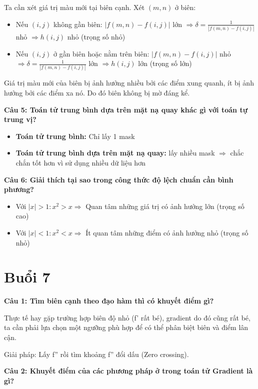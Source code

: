 Ta cần xét giá trị màu mới tại biên cạnh. Xét $(m,n)$ ở biên:
\begin{itemize}
	\item Nếu $(i,j)$ không gần biên: $|f(m,n) - f(i,j)|$ lớn $\Rightarrow \delta = \frac{1}{|f(m,n) - f(i,j)|}$ nhỏ $\Rightarrow h(i,j)$ nhỏ (trọng số nhỏ)
	
	\item Nếu $(i,j)$ ở gần biên hoặc nằm trên biên: $|f(m,n) - f(i,j)|$ nhỏ $\Rightarrow \delta = \frac{1}{|f(m,n) - f(i,j)|}$ lớn $\Rightarrow h(i,j)$ lớn (trọng số lớn)
\end{itemize}
Giá trị màu mới của biên bị ảnh hưởng nhiều bởi các điểm xung quanh, ít bị ảnh hưởng bởi các điểm xa nó. Do đó biên không bị mờ đáng kể.

\textbf{Câu 5: Toán tử trung bình dựa trên mặt nạ quay khác gì với toán tự trung vị?}

\begin{itemize}
	\item \textbf{Toán tử trung bình:} Chỉ lấy 1 mask
	
	\item \textbf{Toán tử trung bình dựa trên mặt nạ quay:} lấy nhiều mask $\Rightarrow$ chắc chắn tốt hơn vì sử dụng nhiều dữ liệu hơn
\end{itemize}

\textbf{Câu 6: Giải thích tại sao trong công thức độ lệch chuẩn cần bình phương?}

\begin{itemize}
	\item Với $|x| > 1: x^2 > x ⇒$ Quan tâm những giá trị có ảnh hưởng lớn (trọng số cao)

	\item Với $|x| < 1: x^2 < x ⇒$ Ít quan tâm những điểm có ảnh hưởng nhỏ (trọng số nhỏ)
\end{itemize}

\section{Buổi 7}

\textbf{Câu 1: Tìm biên cạnh theo đạo hàm thì có khuyết điểm gì?}

Thực tế hay gặp trường hợp biên độ nhỏ (f' rất bé), gradient do đó cũng rất bé, ta cần phải lựa chọn một ngưỡng phù hợp để có thể phân biệt biên và điểm lân cận.

Giải pháp: Lấy f'' rồi tìm khoảng f'' đổi dấu (Zero crossing).

\textbf{Câu 2: Khuyết điểm của các phương pháp ở trong toán tử Gradient là gì?}

